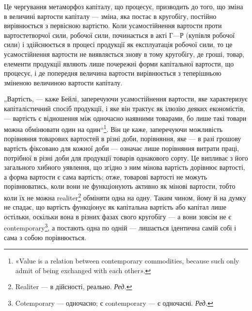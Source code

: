 Це чергування метаморфоз капіталу, що процесує, призводить до
того, що зміна в величині вартости капіталу — зміна, яка постає в кругобігу,
постійно вирівнюється з первісною вартістю. Коли усамостійнення
вартости проти вартостетворчої сили, робочої сили, починається в акті
$Г — Р$ (купівля робочої сили) і здійснюється в процесі продукції як
експлуатація робочої сили, то це усамостійнення вартости не виявляється
знову в тому кругобігу, де гроші, товар, елементи продукції являють
лише почережні форми капітальної вартости, що процесує, і де попередня
величина вартости вирівнюється з теперішньою зміненою величиною
вартости капіталу.

„Вартість, — каже Бейлі, заперечуючи усамостійнення вартости, яке
характеризує капіталістичний спосіб продукції, і яке він трактує як
ілюзію деяких економістів, — вартість є відношення між одночасно наявними
товарами, бо лише такі товари можна обмінювати один на один“\footnote*{
«Value is a relation between contemporary commodities, because such only
admit of being exchanged with each other».
}.
Він це каже, заперечуючи можливість порівняння товарових вартостей в
різні доби, порівняння, яке — в разі грошову вартість фіксовано для
кожної доби — означає лише порівняння витрати праці, потрібної в різні
доби для продукції товарів однакового сорту. Це випливає з його загального
хибного уявлення, що згідно з ним мінова вартість дорівнює
вартості, а форма вартости є сама вартість; отже, товарові вартості не
можуть порівнюватись, коли вони не функціонують активно як мінові вартости,
тобто коли їх не можна realiter\footnote*{
Realiter — в дійсності, реально. \emph{Ред.}
} обміняти одна на одну. Таким
чином, йому й на думку не спадає, що вартість функціонує як капітальна
вартість або капітал лише остільки, оскільки вона в різних фазах свого
кругобігу — а вони зовсім не є contemporary\footnote*{
Cotemporary — одночасно; є contemporary — є одночасні. \emph{Ред.}
}, а постають одна по
одній — лишається ідентична самій собі і сама з собою порівнюється.

